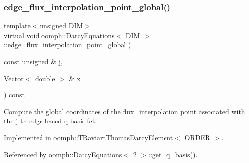\mbox{\label{classoomph_1_1DarcyEquations_a250719cbe94e97c88996b5b4f5553649}} 
\subsubsection{\texorpdfstring{edge\+\_\+flux\+\_\+interpolation\+\_\+point\+\_\+global()}{edge\_flux\_interpolation\_point\_global()}\hspace{0.1cm}{\footnotesize\ttfamily [1/2]}}
{\footnotesize\ttfamily template$<$unsigned D\+IM$>$ \\
virtual void \hyperlink{classoomph_1_1DarcyEquations}{oomph\+::\+Darcy\+Equations}$<$ D\+IM $>$\+::edge\+\_\+flux\+\_\+interpolation\+\_\+point\+\_\+global (\begin{DoxyParamCaption}\item[{const unsigned \&}]{j,  }\item[{\hyperlink{classoomph_1_1Vector}{Vector}$<$ double $>$ \&}]{x }\end{DoxyParamCaption}) const\hspace{0.3cm}{\ttfamily [pure virtual]}}



Compute the global coordinates of the flux\+\_\+interpolation point associated with the j-\/th edge-\/based q basis fct. 



Implemented in \hyperlink{classoomph_1_1TRaviartThomasDarcyElement_a11c49e611acc0becbf0907766b5e9938}{oomph\+::\+T\+Raviart\+Thomas\+Darcy\+Element$<$ O\+R\+D\+E\+R $>$}.



Referenced by oomph\+::\+Darcy\+Equations$<$ 2 $>$\+::get\+\_\+q\+\_\+basis().

\mbox{\label{classoomph_1_1DarcyEquations_a46a2b8488be8bb249852b4771b25c30a}} 
